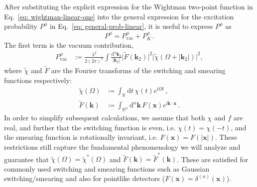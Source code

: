 \documentclass[11pt,prd,onecolumn,superscriptaddress,nofootinbib,floatfix,amsmath,amssymb]{revtex4-2}
\newcommand{\ii}{\mathrm{i}}
\newcommand{\bx}{\bm{x}}
\newcommand{\bk}{{\bm{k}}}
\newcommand{\dd}{\textrm{d}}
\newcommand{\vac}{\text{vac}}
\begin{document}
    After substituting the explicit expression for the Wightman two-point function in Eq.~\eqref{eq: wightman-linear-one} into the general expression for the excitation probability $P^\phi$ in Eq.~\eqref{eq: general-prob-linear}, it is useful to express  $P^\phi$ as 
    \begin{equation}
        P^\phi = P^\phi_{\vac}+P^\phi_K\,.
        \label{eq: prob-linear-schematic}
    \end{equation}
    The first term is the vacuum contribution,
    \begin{align}
        P_{\vac}^{\phi} &:= \frac{\lambda^2}{2(2\pi)^n}\int\frac{{\dd}^n \bm{k}_2}{|\bm{k}_2|} \bigr|\tilde{F}(\bm{k}_2)\bigr|^2  \bigr|\tilde{\chi}\left(\Omega+|\bm{k}_2|\right)\bigr|^2,
        \label{eq:linearvacuum}
    \end{align}
    where $\tilde\chi$ and $\tilde{F}$ are the Fourier transforms of the switching and smearing functions respectively:
    \begin{equation}
    \begin{split}
   	    \tilde \chi(\Omega)&\coloneqq\int_\mathbb{R}\!\dd t\, \chi(t)e^{\ii \Omega t}\,,\\
        \tilde F(\bm k) &\coloneqq\int_{\mathbb{R}^n}\!\!\dd^n \bm k\, F(\bm x)e^{\ii \bm k\cdot\bm x}\,.
   	    \label{eq: Fourier-transform}
    	\end{split}
    \end{equation}
    In order to simplify subsequent calculations, we assume that both $\chi$ and $f$ are real, and further that the switching function is even, i.e. $\chi(t) = \chi(-t)$, and the smearing function is  rotationally invariant, i.e. $F(\bx) = F(|\bx|)$. These restrictions still capture the fundamental phenomenology we will analyze and  guarantee that $\tilde{\chi}(\Omega) = \tilde\chi^*(\Omega) $ and $\tilde{F}(\bk) = \tilde{F}^*(\bk)$. These are satisfied for commonly used switching and smearing functions such as Gaussian switching/smearing and also for pointlike detectors ($F(\bx) = \delta^{(n)}(\bx)$).
\end{document}
